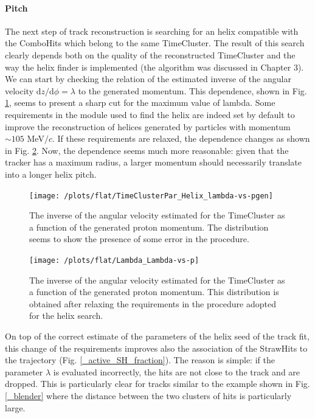 \documentclass[12pt,a4paper,openright, oneside, titlepage]{book} %
\begin{document}
\paragraph{Pitch}
The next step of track reconstruction is searching for an helix compatible 
with the ComboHits which belong to the same TimeCluster.
The result of this search clearly depends both on the quality of the reconstructed TimeCluster and the way the helix finder is implemented (the algorithm was discussed in Chapter 3). 
We can start by checking the relation of the estimated inverse of the angular velocity $\mathrm{d}z/\mathrm{d}\phi= \lambda$ to the generated momentum. 
This dependence, shown in Fig. \ref{_TimeClusterMVA_Lambda-vs-p}, seems to present a sharp cut for the maximum value of lambda.  
Some requirements in the module used to find the helix are indeed set by default to improve the reconstruction of helices generated by particles with momentum $\sim 105$ MeV$/c$. 
If these requirements are relaxed, the dependence changes as shown in Fig. \ref{_Lambda_Lambda-vs-p}. 
Now, the dependence seems much more reasonable: given that the tracker has a maximum radius, a larger momentum should necessarily translate into a longer helix pitch.

\begin{figure}[!htb]
\centering
\texttt{[image: /plots/flat/TimeClusterPar\_Helix\_lambda-vs-pgen]}
\caption[Inverse of angular velocity]{The inverse of the angular velocity estimated for the TimeCluster as a function of the generated proton momentum. 
The distribution seems to show the presence of some error in the procedure.}
\label{_TimeClusterMVA_Lambda-vs-p}
\end{figure}

\begin{figure}[!htb]
\centering
\texttt{[image: /plots/flat/Lambda\_Lambda-vs-p]}
\caption[Inverse of angular velocity after the change]{The inverse of the angular velocity estimated for the TimeCluster as a function of the generated proton momentum.
This distribution is obtained after relaxing the requirements in the procedure adopted for the helix search.}
\label{_Lambda_Lambda-vs-p}
\end{figure}

\noindent On top of the correct estimate of the parameters of the helix seed of the track fit, 
this change of the requirements improves also the association of the StrawHits to the trajectory 
(Fig. \ref{_active_SH_fraction}). 
The reason is simple: 
if the parameter $\lambda$ is evaluated incorrectly, 
the hits are not close to the track and are dropped. 
This is particularly clear for tracks similar to the example shown in Fig. \ref{_blender} 
where the distance between the two clusters of hits is particularly large. 
\end{document}
